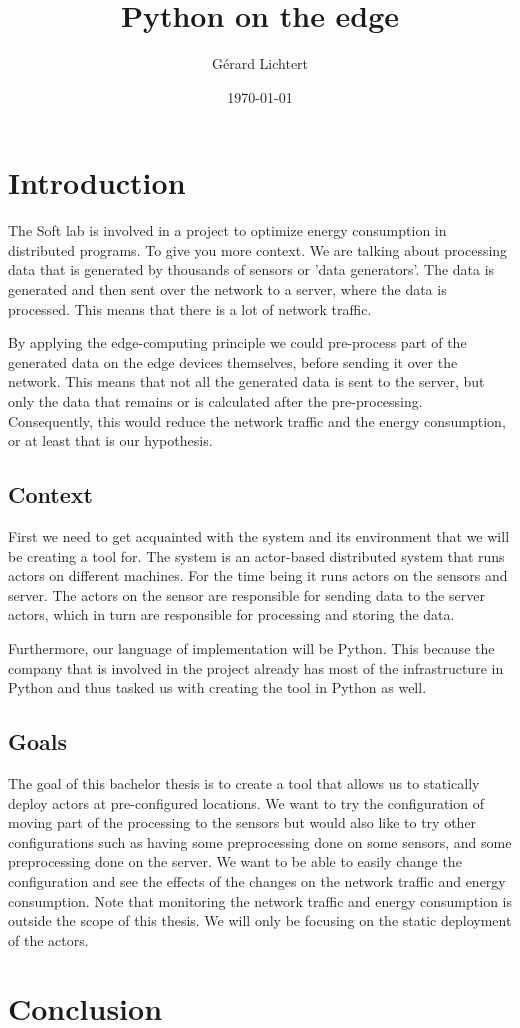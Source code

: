 \documentclass[a4paper]{article}
\title{Python on the edge}
\author{Gérard Lichtert}
\date{\today}
\begin{document}
\maketitle
\tableofcontents
\newpage
\raggedright{}


\section{Introduction}
The Soft lab is involved in a project to optimize energy consumption in distributed programs. To give you more context. We are talking about processing data that is generated by thousands of sensors or 'data generators'. The data is generated and then sent over the network to a server, where the data is processed. This means that there is a lot of network traffic.

By applying the edge-computing principle we could pre-process part of the generated data on the edge devices themselves, before sending it over the network. This means that not all the generated data is sent to the server, but only the data that remains or is calculated after the pre-processing. Consequently, this would reduce the network traffic and the energy consumption, or at least that is our hypothesis.
\subsection{Context}
First we need to get acquainted with the system and its environment that we will be creating a tool for. The system is an actor-based distributed system that runs actors on different machines. For the time being it runs actors on the sensors and server. The actors on the sensor are responsible for sending data to the server actors, which in turn are responsible for processing and storing the data.

Furthermore, our language of implementation will be Python. This because the company that is involved in the project already has most of the infrastructure in Python and thus tasked us with creating the tool in Python as well.

\subsection{Goals}
The goal of this bachelor thesis is to create a tool that allows us to statically deploy actors at pre-configured locations. We want to try the configuration of moving part of the processing to the sensors but would also like to try other configurations such as having some preprocessing done on some sensors, and some preprocessing done on the server. We want to be able to easily change the configuration and see the effects of the changes on the network traffic and energy consumption. Note that monitoring the network traffic and energy consumption is outside the scope of this thesis. We will only be focusing on the static deployment of the actors.

\section{Conclusion}

\end{document}
